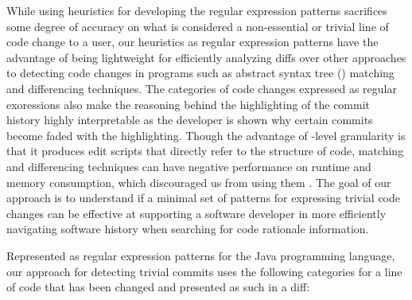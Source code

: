While using heuristics for developing the regular expression patterns sacrifices some degree of accuracy on what is considered a non-essential or trivial line of code change to a user,
our heuristics as regular expression patterns have the advantage of being lightweight for efficiently analyzing diffs over other approaches to detecting code changes in programs such as abstract syntax tree () matching and differencing techniques.
The categories of code changes expressed as regular exoressions also make the reasoning behind the highlighting of the commit history highly interpretable as the developer is shown why certain commits become faded with the highlighting.
Though the advantage of -level granularity is that it produces edit scripts that directly refer to the structure of code, 
 matching and differencing techniques can have negative performance on runtime and memory consumption, 
which discouraged us from using them \cite{fluri_change_2007,pawlik_RTED_2011,falleri_fine-grained_2014}.
The goal of our approach is to understand if a minimal set of patterns for expressing trivial code changes can be effective at supporting a software developer in more efficiently navigating software history when searching for code rationale information.

Represented as regular expression patterns for the Java programming language, 
our approach for detecting trivial commits uses the following categories for a line of code that has been changed and presented as such in a diff: 

